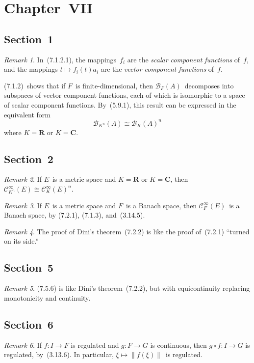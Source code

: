 \documentclass[letterpaper,12pt]{article}
\newcommand{\R}{\mathbf{R}}
\newcommand{\C}{\mathbf{C}}
\newcommand{\B}{\mathcal{B}}
\newcommand{\BC}{\mathcal{C}^{\infty}}
\newcommand{\after}{\circ}
\newcommand{\iso}{\cong}
\newcommand{\norm}[1]{\lVert{#1}\rVert}
\theoremstyle{plain}
\theoremstyle{definition}
\theoremstyle{remark}
\newtheorem*{rmk}{Remark}
\begin{document}
\section*{Chapter~VII}
\subsection*{Section~1}
\begin{rmk}
In~(7.1.2.1), the mappings~\(f_i\) are the \emph{scalar component functions} of~\(f\), and the mappings \(t\mapsto f_i(t)a_i\) are the \emph{vector component functions} of~\(f\).

(7.1.2)~shows that if \(F\)~is finite-dimensional, then \(\B_F(A)\)~decomposes into subspaces of vector component functions, each of which is isomorphic to a space of scalar component functions. By~(5.9.1), this result can be expressed in the equivalent form
\[\B_{K^n}(A)\iso\B_K(A)^n\]
where \(K=\R\) or \(K=\C\).
\end{rmk}

\subsection*{Section~2}
\begin{rmk}
If \(E\)~is a metric space and \(K=\R\) or \(K=\C\), then \(\BC_{K^n}(E)\iso\BC_K(E)^n\).
\end{rmk}

\begin{rmk}
If \(E\)~is a metric space and \(F\)~is a Banach space, then \(\BC_F(E)\)~is a Banach space, by (7.2.1), (7.1.3), and~(3.14.5).
\end{rmk}

\begin{rmk}
The proof of Dini's theorem~(7.2.2) is like the proof of~(7.2.1) ``turned on its side.''
\end{rmk}

\subsection*{Section~5}
\begin{rmk}
(7.5.6) is like Dini's theorem~(7.2.2), but with equicontinuity replacing monotonicity and continuity.
\end{rmk}

\subsection*{Section~6}
\begin{rmk}
If \(f:I\to F\) is regulated and \(g:F\to G\) is continuous, then \(g\after f:I\to G\) is regulated, by~(3.13.6). In particular, \(\xi\mapsto\norm{f(\xi)}\)~is regulated.
\end{rmk}
\end{document}
